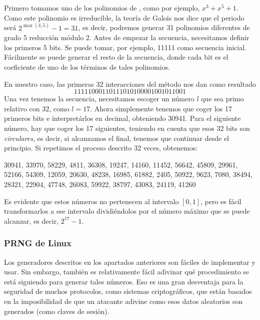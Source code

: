 \begin{example}\label{example:lfsrg}
Primero tomamos uno de los polinomios de \cite{zierler1969}, como por ejemplo, $x^3+x^5+1$. Como este polinomio es irreducible, la teoría de Galois nos dice que el periodo será $2^{\max(3,5)}-1=31$, es decir, podremos generar 31 polinomios diferentes de grado 5 reducción módulo 2. Antes de empezar la secuencia, necesitamos definir los primeros 5 bits. Se puede tomar, por ejemplo, 11111 como secuencia inicial. Fácilmente se puede generar el resto de la secuencia, donde cada bit es el coeficiente de uno de los términos de tales polinomios. 

En nuestro caso, las primeras 32 interacciones del método nos dan como resultado
\[
11111000110111010100001001011001
\]
Una vez tenemos la secuencia, necesitamos escoger un número $l$ que sea primo relativo con 32, como $l=17$. Ahora simplemente tenemos que coger los 17 primeros bits e interpretárlos en decimal, obteniendo 30941. Para el siguiente número, hay que coger los 17 siguientes, teniendo en cuenta que esos 32 bits son \textit{circulares}, es decir, si alcanzamos el final, tenemos que continuar desde el principio. Si repetimos el proceso descrito 32 veces, obtenemos:
\begin{center}
30941, 33970, 58229, 4811, 36308, 19247, 14160, 11452, 56642, 45809, 29961, 52166, 54309, 12059, 20630, 48238, 16985, 61882, 2405, 50922, 9623, 7080, 38494, 28321, 22904, 47748, 26083, 59922, 38797, 43083, 24119, 41260
\end{center}
Es evidente que estos números no pertenecen al intervalo $[0,1]$, pero es fácil transformarlos a ese intervalo dividiéndolos por el número máximo que se puede alcanzar, es decir, $2^{17}-1$.
\end{example}

\subsubsection{PRNG de Linux}

Los generadores descritos en los apartados anteriores son fáciles de implementar y usar. Sin embargo, también es relativamente fácil adivinar qué procedimiento se está siguiendo para generar tales números. Eso es una gran desventaja para la seguridad de muchos protocolos, como sistemas criptográficos, que están basados en la imposibilidad de que un atacante adivine como esos datos aleatorios son generados (como claves de sesión).

